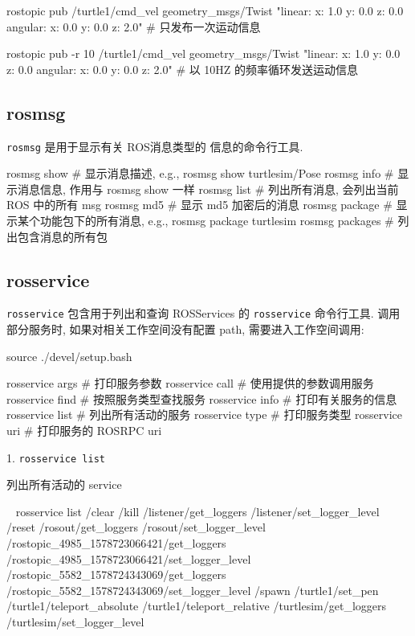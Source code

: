\documentclass[openany, fontset=windowsold]{ctexbook}
\theoremstyle{kaiti}
\theoremstyle{normal}
\begin{document}
\begin{bash}
  rostopic pub /turtle1/cmd_vel geometry_msgs/Twist
  "linear:
    x: 1.0
    y: 0.0
    z: 0.0
  angular:
    x: 0.0
    y: 0.0
    z: 2.0"
  # 只发布一次运动信息

  rostopic pub -r 10 /turtle1/cmd_vel geometry_msgs/Twist
  "linear:
    x: 1.0
    y: 0.0
    z: 0.0
  angular:
    x: 0.0
    y: 0.0
    z: 2.0"
  # 以 10HZ 的频率循环发送运动信息
\end{bash}

\subsection{rosmsg}

\verb|rosmsg| 是用于显示有关 ROS消息类型的 信息的命令行工具.

\begin{bash}
  rosmsg show       # 显示消息描述, e.g., rosmsg show turtlesim/Pose
  rosmsg info       # 显示消息信息, 作用与 rosmsg show 一样
  rosmsg list       # 列出所有消息, 会列出当前 ROS 中的所有 msg
  rosmsg md5        # 显示 md5 加密后的消息
  rosmsg package    # 显示某个功能包下的所有消息, e.g., rosmsg package turtlesim
  rosmsg packages   # 列出包含消息的所有包
\end{bash}

\subsection{rosservice}

\verb|rosservice| 包含用于列出和查询 ROSServices 的 \verb|rosservice| 命令行工具. 调用部分服务时, 如果对相关工作空间没有配置 path, 需要进入工作空间调用:

\begin{bash}
  source ./devel/setup.bash
\end{bash}

\begin{bash}
  rosservice args     # 打印服务参数
  rosservice call     # 使用提供的参数调用服务
  rosservice find     # 按照服务类型查找服务
  rosservice info     # 打印有关服务的信息
  rosservice list     # 列出所有活动的服务
  rosservice type     # 打印服务类型
  rosservice uri      # 打印服务的 ROSRPC uri
\end{bash}

1. \verb|rosservice list|

列出所有活动的 service

\begin{bash}
  ~ rosservice list
  /clear
  /kill
  /listener/get_loggers
  /listener/set_logger_level
  /reset
  /rosout/get_loggers
  /rosout/set_logger_level
  /rostopic_4985_1578723066421/get_loggers
  /rostopic_4985_1578723066421/set_logger_level
  /rostopic_5582_1578724343069/get_loggers
  /rostopic_5582_1578724343069/set_logger_level
  /spawn
  /turtle1/set_pen
  /turtle1/teleport_absolute
  /turtle1/teleport_relative
  /turtlesim/get_loggers
  /turtlesim/set_logger_level
\end{bash}
\end{document}
